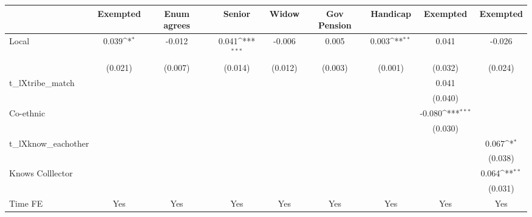 {
\def\sym#1{\ifmmode^{#1}\else\(^{#1}\)\fi}
\begin{tabular}{l*{8}{c}}
\hline\hline
                &\multicolumn{1}{c}{Exempted}&\multicolumn{1}{c}{Enum agrees}&\multicolumn{1}{c}{Senior}&\multicolumn{1}{c}{Widow}&\multicolumn{1}{c}{Gov Pension}&\multicolumn{1}{c}{Handicap}&\multicolumn{1}{c}{Exempted}&\multicolumn{1}{c}{Exempted}\\
\hline
Local           &    0.039\sym{*}  &   -0.012         &    0.041\sym{***}&   -0.006         &    0.005         &    0.003\sym{**} &    0.041         &   -0.026         \\
                &  (0.021)         &  (0.007)         &  (0.014)         &  (0.012)         &  (0.003)         &  (0.001)         &  (0.032)         &  (0.024)         \\
t\_lXtribe\_match &                  &                  &                  &                  &                  &                  &    0.041         &                  \\
                &                  &                  &                  &                  &                  &                  &  (0.040)         &                  \\
Co-ethnic       &                  &                  &                  &                  &                  &                  &   -0.080\sym{***}&                  \\
                &                  &                  &                  &                  &                  &                  &  (0.030)         &                  \\
t\_lXknow\_eachother&                  &                  &                  &                  &                  &                  &                  &    0.067\sym{*}  \\
                &                  &                  &                  &                  &                  &                  &                  &  (0.038)         \\
Knows Colllector&                  &                  &                  &                  &                  &                  &                  &    0.064\sym{**} \\
                &                  &                  &                  &                  &                  &                  &                  &  (0.031)         \\
Time FE         &      Yes         &      Yes         &      Yes         &      Yes         &      Yes         &      Yes         &      Yes         &      Yes         \\

\end{tabular}}

